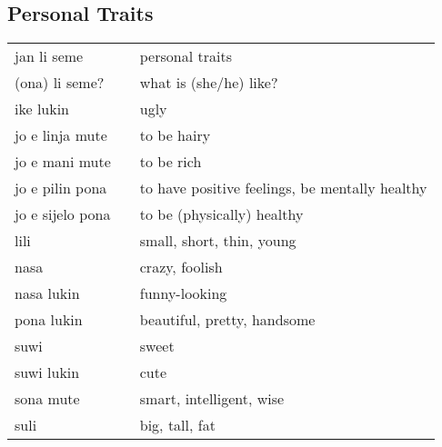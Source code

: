 \subsection{Personal Traits}
%
\begin{supertabular}{p{4,5cm}|ll}
    jan li seme\     &  & personal traits                                \\
    (ona) li seme?   &  & what is (she/he) like?                         \\
    ike lukin        &  & ugly                                           \\
    jo e linja mute  &  & to be hairy                                    \\
    jo e mani mute   &  & to be rich                                     \\
    jo e pilin pona  &  & to have positive feelings, be mentally healthy \\
    jo e sijelo pona &  & to be (physically) healthy                     \\
    lili             &  & small, short, thin, young                      \\
    nasa             &  & crazy, foolish                                 \\
    nasa lukin       &  & funny-looking                                  \\
    pona lukin       &  & beautiful, pretty, handsome                    \\
    suwi             &  & sweet                                          \\
    suwi lukin       &  & cute                                           \\
    sona mute        &  & smart, intelligent, wise                       \\
    suli             &  & big, tall, fat                                 \\
\end{supertabular} \\
%
%
